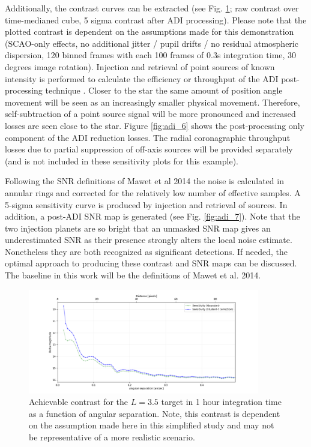 Additionally, the contrast curves can be extracted (see Fig. \ref{fig:adi_5}; raw contrast over time-medianed cube, 5 sigma contrast after ADI processing). Please note that the plotted contrast is dependent on the assumptions made for this demonstration (SCAO-only effects, no additional jitter / pupil drifts / no residual atmospheric dispersion, 120 binned frames with each 100 frames of 0.3s integration time, 30 degrees image rotation). 
Injection and retrieval of point sources of known intensity is performed to calculate the efficiency or throughput of the ADI post-processing technique . Closer to the star the same amount of position angle movement will be seen as an increasingly smaller physical movement. Therefore, self-subtraction of a point source signal will be more pronounced and increased losses are seen close to the star. Figure \ref{fig:adi_6} shows the post-processing only component of the ADI reduction losses. The radial coronagraphic throughput losses due to partial suppression of off-axis sources will be provided separately (and is not included in these sensitivity plots for this example).

Following the SNR definitions of Mawet et al 2014 the noise is calculated in annular rings and corrected for the relatively low number of effective samples. A 5-sigma sensitivity curve is produced by injection and retrieval of sources. In addition, a post-ADI SNR map is generated (see Fig. \ref{fig:adi_7}). Note that the two injection planets are so bright that an unmasked SNR map gives an underestimated SNR as their presence strongly alters the local noise estimate. Nonetheless they are both recognized as significant detections. If needed, the optimal approach to producing these contrast and SNR maps can be discussed. The baseline in this work will be the definitions of Mawet et al. 2014.

\begin{figure}[!ht]
  \centering
  \includegraphics[width=0.9\textwidth]{./figures/adi_contrast.png}
  \caption[Achievable contrast in 1 hour integration time]{Achievable contrast for the $L=3.5$ target in 1 hour integration time as a function of angular separation. Note, this contrast is dependent on the assumption made here in this simplified study and may not be representative of a more realistic scenario.}
  \label{fig:adi_5}
\end{figure}



